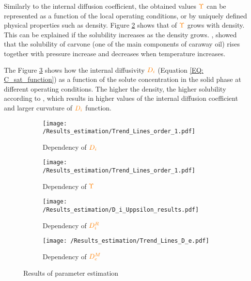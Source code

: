 \documentclass[../Article_Model_Parameters.tex]{subfiles}
\begin{document}
	Similarly to the internal diffusion coefficient, the obtained values ${\color{orange}\Upsilon}$ can be represented as a function of the local operating conditions, or by uniquely defined physical properties such as density. Figure \ref{fig: results_upsilon} shows that of ${\color{orange}\Upsilon}$ grows with density. This can be explained if the solubility increases as the density grows. \citet{Shojaie2010}, showed that the solubility of carvone (one of the main components of caraway oil) rises together with pressure increase and decreases when temperature increases.
	
	The Figure \ref{fig:Di_upsilon_res} shows how the internal diffusivity ${\color{orange}D_i}$ (Equation \ref{EQ: C_sat_function}) as a function of the solute concentration in the solid phase at different operating conditions. The higher the density, the higher solubility according to \citet{Shojaie2010}, which results in higher values of the internal diffusion coefficient and larger curvature of ${\color{orange}D_i}$ function.

		\begin{figure}[!h]
		\centering
		\begin{subfigure}[b]{0.49\columnwidth}
			\centering
			\texttt{[image: /Results\_estimation/Trend\_Lines\_order\_1.pdf]}
			\caption{Dependency of ${\color{orange}D_i}$}
			\label{fig: results_DI}
		\end{subfigure}
		\begin{subfigure}[b]{0.49\columnwidth}
			\centering
			\texttt{[image: /Results\_estimation/Trend\_Lines\_order\_1.pdf]}
			\caption{Dependency of ${\color{orange}\Upsilon}$}
			\label{fig: results_upsilon}
		\end{subfigure}
		\hfill
		\begin{subfigure}[b]{0.49\columnwidth}
			\texttt{[image: /Results\_estimation/D\_i\_Uppsilon\_results.pdf]}
			\caption{Dependency of ${\color{orange}D^R_i}$}
			\label{fig:Di_upsilon_res}
		\end{subfigure}
		\begin{subfigure}[b]{0.49\columnwidth}
			\centering
			\texttt{[image: /Results\_estimation/Trend\_Lines\_D\_e.pdf]}
			\caption{Dependency of ${\color{orange}D^M_e}$}
			\label{fig: results_De}
		\end{subfigure}
		\caption{Results of parameter estimation}
		\label{fig: estimation_results_DI_GAMMA}
	\end{figure}
	
\end{document}
